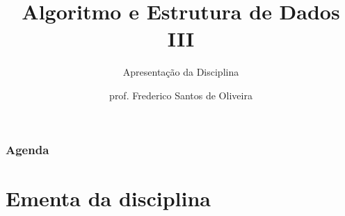 \documentclass[aspectratio=169]{beamer}
\title[Apresentação da Disciplina]{Algoritmo e Estrutura de Dados III}
\subtitle{Apresentação da Disciplina}
\author[Frederico Santos de Oliveira]{prof. Frederico Santos de Oliveira}
\institute[UFMT]{Universidade Federal de Mato Grosso\\ Faculdade de Engenharia}
\date{}
\begin{document}
\begin{frame}[plain]
  \titlepage
\end{frame}


\begin{frame}
  \frametitle{Agenda}
  \tableofcontents
\end{frame}

%

\section{Ementa da disciplina}
\end{document}
